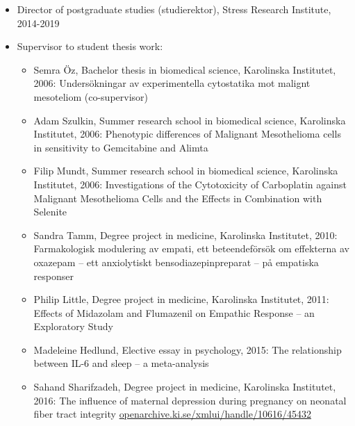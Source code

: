 \documentclass[10pt,a4paper,twocolumn]{article}
\begin{document}
\begin{itemize}
\begin{itemize}
        \item Scientific Illustration and Visualization, PhD course, Karolinska Institutet 2023-

    \end{itemize}


    \item Director of postgraduate studies (studierektor), Stress Research Institute, 2014-2019


    \item Supervisor to student thesis work:

    \begin{itemize}

        \item Semra Öz, Bachelor thesis in biomedical science, Karolinska Institutet, 2006: Undersökningar av experimentella cytostatika mot malignt mesoteliom (co-supervisor)

        \item Adam Szulkin, Summer research school in biomedical science, Karolinska Institutet, 2006: Phenotypic differences of Malignant Mesothelioma cells in sensitivity to Gemcitabine and Alimta

        \item Filip Mundt, Summer research school in biomedical science, Karolinska Institutet, 2006: Investigations of the Cytotoxicity of Carboplatin against Malignant Mesothelioma Cells and the Effects in Combination with Selenite

        \item Sandra Tamm, Degree project in medicine, Karolinska Institutet, 2010: Farmakologisk modulering av empati, ett beteendeförsök om effekterna av oxazepam – ett anxiolytiskt bensodiazepinpreparat – på empatiska responser

        \item Philip Little, Degree project in medicine, Karolinska Institutet, 2011: Effects of Midazolam and Flumazenil on Empathic Response – an Exploratory Study

        \item Madeleine Hedlund, Elective essay in psychology, 2015: The relationship between IL-6 and sleep – a meta-analysis

        \item Sahand Sharifzadeh, Degree project in medicine, Karolinska Institutet, 2016: The influence of maternal depression during pregnancy on neonatal fiber tract integrity \href{https://openarchive.ki.se/xmlui/handle/10616/45432}{openarchive.ki.se/xmlui/handle/10616/45432}


\end{itemize}
\end{itemize}
\end{document}

